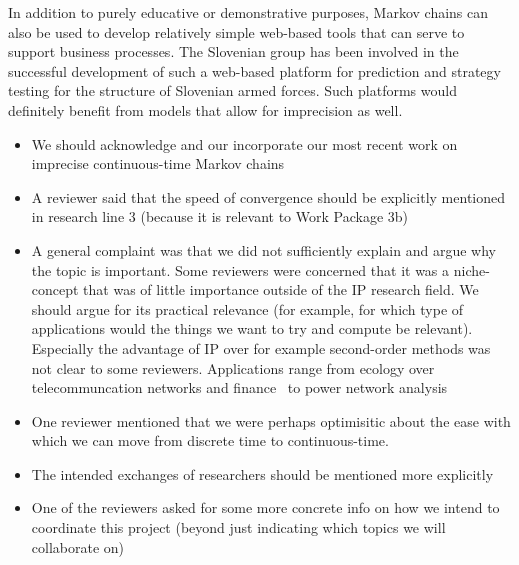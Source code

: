 \documentclass[11pt,dvipsnames,usenames,a4paper]{article}
\begin{document}
In addition to purely educative or demonstrative purposes, Markov chains can also be used to develop relatively simple web-based tools that can serve to support business processes. 
The Slovenian group has been involved in the successful development of such a web-based platform for prediction and strategy testing for the structure of Slovenian armed forces. 
Such platforms would definitely benefit from models that allow for imprecision as well.


{\color{red}
\begin{itemize}
\item
We should acknowledge and our incorporate our most recent work on imprecise continuous-time Markov chains \cite{rottondi2017:flexigrid,erreygers2017:ictmcs}
\item
A reviewer said that the speed of convergence should be explicitly mentioned in research line 3 (because it is relevant to Work Package 3b)
\item
A general complaint was that we did not sufficiently explain and argue why the topic is important. Some reviewers were concerned that it was a niche-concept that was of little importance outside of the IP research field. We should argue for its practical relevance (for example, for which type of applications would the things we want to try and compute be relevant). Especially the advantage of IP over for example second-order methods was not clear to some reviewers. Applications range from ecology \cite{samuels2009phd} over telecommuncation networks \cite{rottondi2017:flexigrid} and finance~\cite{niemiec2007:bonusmalus} to power network analysis \cite{Troffaes+GSB-ISIPTA15p}
\item
One reviewer mentioned that we were perhaps optimisitic about the ease with which we can move from discrete time to continuous-time.
\item
The intended exchanges of researchers should be mentioned more explicitly
\item
One of the reviewers asked for some more concrete info on how we intend to coordinate this project (beyond just indicating which topics we will collaborate on)
\end{itemize}}
\end{document}
